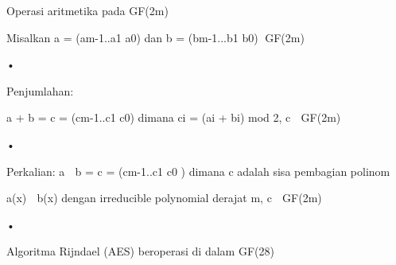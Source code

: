 \documentclass{article}
\begin{document}

Operasi aritmetika pada GF(2m) 

 Misalkan a = (am-1..a1 a0) dan b = (bm-1...b1 b0) GF(2m) 

•

Penjumlahan:  


a + b = c = (cm-1..c1 c0) dimana ci = (ai + bi) mod 2, c  GF(2m) 

•

Perkalian: a  b = c = (cm-1..c1 c0 ) dimana c adalah sisa pembagian polinom 

a(x)  b(x) dengan irreducible polynomial derajat m,  c  GF(2m)

•

Algoritma Rijndael (AES) beroperasi di dalam GF(28)
\end{document}
